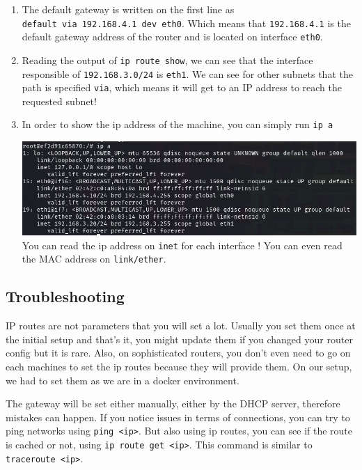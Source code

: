 \documentclass[a4paper,11pt,singlespacing]{article}
\begin{document}
\begin{enumerate}
\def\labelenumi{\arabic{enumi}.}
\item
  The default gateway is written on the first line as
  \texttt{default\ via\ 192.168.4.1\ dev\ eth0}. Which means that
  \texttt{192.168.4.1} is the default gateway address of the router and
  is located on interface \texttt{eth0}.
\item
  Reading the output of \texttt{ip\ route\ show}, we can see that the
  interface responsible of \texttt{192.168.3.0/24} is \texttt{eth1}. We
  can see for other subnets that the path is specified \texttt{via},
  which means it will get to an IP address to reach the requested
  subnet!
\item
  In order to show the ip address of the machine, you can simply run
  \texttt{ip\ a}

  \includegraphics{Images/Image05.png}
  You can read the ip address on \texttt{inet} for each interface ! You
  can even read the MAC address on \texttt{link/ether}.
\end{enumerate}

\subsection{Troubleshooting}\label{troubleshooting}

IP routes are not parameters that you will set a lot. Usually you set
them once at the initial setup and that's it, you might update them if
you changed your router config but it is rare. Also, on sophisticated
routers, you don't even need to go on each machines to set the ip routes
because they will provide them. On our setup, we had to set them as we
are in a docker environment.

The gateway will be set either manually, either by the DHCP server,
therefore mistakes can happen. If you notice issues in terms of
connections, you can try to ping networks using
\texttt{ping\ \textless{}ip\textgreater{}}. But also using ip routes,
you can see if the route is cached or not, using
\texttt{ip\ route\ get\ \textless{}ip\textgreater{}}. This command is
similar to \texttt{traceroute\ \textless{}ip\textgreater{}}.
\end{document}
